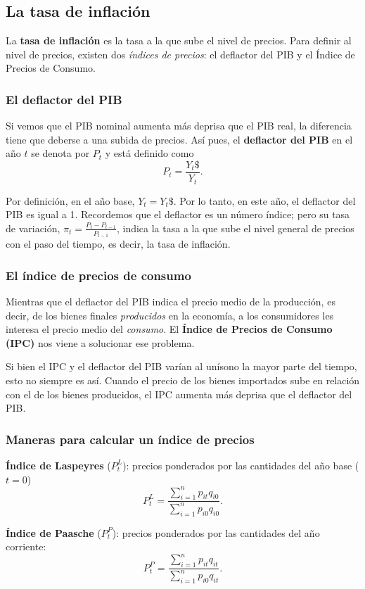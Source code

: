 \documentclass[10pt, landscape]{article}
\begin{document}
\begin{multicols*}{3}
\subsection{La tasa de inflación}
La \textbf{tasa de inflación} es la tasa a la que sube el nivel de precios. Para definir al nivel de precios, existen dos \textit{índices de precios}: el deflactor del PIB y el Índice de Precios de Consumo.

\subsubsection{El deflactor del PIB}
Si vemos que el PIB nominal aumenta más deprisa que el PIB real, la diferencia tiene que deberse a una subida de precios. Así pues, el \textbf{deflactor del PIB} en el año $t$ se denota por $P_t$ y está definido como
\[ P_t = \frac{Y_t \$}{Y_t}. \]

Por definición, en el año base, $Y_t = Y_t \$$. Por lo tanto, en este año, el deflactor del PIB es igual a 1. Recordemos que el deflactor es un número índice; pero su tasa de variación, $\pi_t = \frac{P_t - P_{t-1}}{P_{t-1}}$, indica la tasa a la que sube el nivel general de precios con el paso del tiempo, es decir, la tasa de inflación.

\subsubsection{El índice de precios de consumo}
Mientras que el deflactor del PIB indica el precio medio de la producción, es decir, de los bienes finales \textit{producidos} en la economía, a los consumidores les interesa el precio medio del \textit{consumo}. El \textbf{Índice de Precios de Consumo (IPC)} nos viene a solucionar ese problema.

Si bien el IPC y el deflactor del PIB varían al unísono la mayor parte del tiempo, esto no siempre es así. Cuando el precio de los bienes importados sube en relación con el de los bienes producidos, el IPC aumenta más deprisa que el deflactor del PIB.

\subsubsection{Maneras para calcular un índice de precios}
\textbf{Índice de Laspeyres} ($P_t^L$): precios ponderados por las cantidades del año base ($t=0$)
\[ P_t^L = \frac{ \sum_{i=1}^n p_{it} q_{i0} }{\sum_{i=1}^n p_{i0} q_{i0}}. \]

\textbf{Índice de Paasche} ($P_t^P$): precios ponderados por las cantidades del año corriente:
\[ P_t^P = \frac{ \sum_{i=1}^n p_{it} q_{it} }{\sum_{i=1}^n p_{i0} q_{it}}. \]



\end{multicols*}
\end{document}
